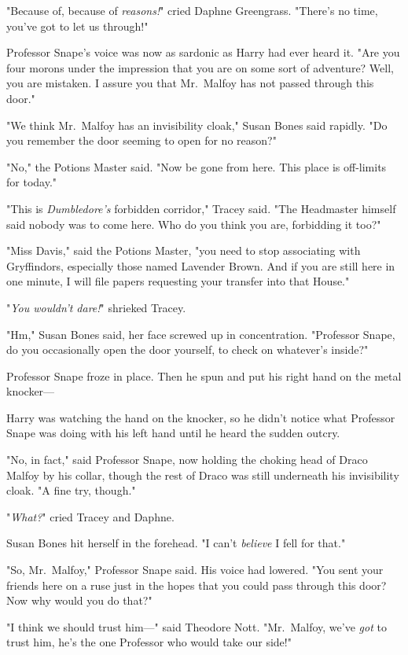 "Because of, because of \emph{reasons!}" cried Daphne Greengrass. "There's no
time, you've got to let us through!"

Professor Snape's voice was now as sardonic as Harry had ever heard it. "Are
you four morons under the impression that you are on some sort of adventure?
Well, you are mistaken. I assure you that Mr.~Malfoy has not passed through
this door."

"We think Mr.~Malfoy has an invisibility cloak," Susan Bones said rapidly. "Do
you remember the door seeming to open for no reason?"

"No," the Potions Master said. "Now be gone from here. This place is off-limits
for today."

"This is \emph{Dumbledore's} forbidden corridor," Tracey said. "The Headmaster
himself said nobody was to come here. Who do you think you are, forbidding it
too?"

"Miss Davis," said the Potions Master, "you need to stop associating with
Gryffindors, especially those named Lavender Brown. And if you are still here
in one minute, I will file papers requesting your transfer into that House."

"\emph{You wouldn't dare!}" shrieked Tracey.

"Hm," Susan Bones said, her face screwed up in concentration. "Professor Snape,
do you occasionally open the door yourself, to check on whatever's inside?"

Professor Snape froze in place. Then he spun and put his right hand on the
metal knocker---

Harry was watching the hand on the knocker, so he didn't notice what Professor
Snape was doing with his left hand until he heard the sudden outcry.

"No, in fact," said Professor Snape, now holding the choking head of Draco
Malfoy by his collar, though the rest of Draco was still underneath his
invisibility cloak. "A fine try, though."

"\emph{What?}" cried Tracey and Daphne.

Susan Bones hit herself in the forehead. "I can't \emph{believe} I fell for
that."

"So, Mr.~Malfoy," Professor Snape said. His voice had lowered. "You sent your
friends here on a ruse{\el} just in the hopes that you could pass through
this door? Now why would you do that?"

"I think we should trust him\mbox{---}" said Theodore Nott. "Mr.~Malfoy, we've
\emph{got} to trust him, he's the one Professor who would take our side!"

